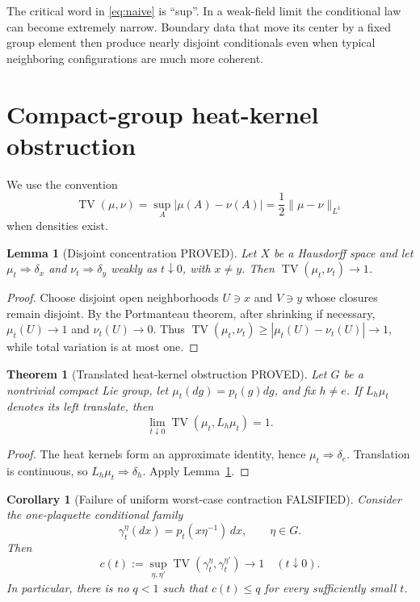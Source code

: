 \documentclass[11pt]{article}
\newcommand{\Pstatus}{\textcolor{proved}{\textsf{PROVED}}}
\newcommand{\Fstatus}{\textcolor{open}{\textsf{FALSIFIED}}}
\newcommand{\TV}{\operatorname{TV}}
\newtheorem{theorem}[definition]{Theorem}
\newtheorem{lemma}[definition]{Lemma}
\newtheorem{corollary}[definition]{Corollary}
\theoremstyle{remark}
\begin{document}
The critical word in \eqref{eq:naive} is ``sup''.  In a weak-field limit the
conditional law can become extremely narrow.  Boundary data that move its
center by a fixed group element then produce nearly disjoint conditionals even
when typical neighboring configurations are much more coherent.

\section{Compact-group heat-kernel obstruction}

We use the convention
\[
 \TV(\mu,\nu)=\sup_{A}|\mu(A)-\nu(A)|
              =\frac12\|\mu-\nu\|_{L^1}
\]
when densities exist.

\begin{lemma}[Disjoint concentration \Pstatus]\label{lem:disjoint}
Let $X$ be a Hausdorff space and let $\mu_t\Rightarrow\delta_x$ and
$\nu_t\Rightarrow\delta_y$ weakly as $t\downarrow0$, with $x\ne y$.
Then $\TV(\mu_t,\nu_t)\to1$.
\end{lemma}

\begin{proof}
Choose disjoint open neighborhoods $U\ni x$ and $V\ni y$ whose closures remain
disjoint.  By the Portmanteau theorem, after shrinking if necessary,
$\mu_t(U)\to1$ and $\nu_t(U)\to0$.  Thus
$\TV(\mu_t,\nu_t)\ge|\mu_t(U)-\nu_t(U)|\to1$, while total variation is at most
one.
\end{proof}

\begin{theorem}[Translated heat-kernel obstruction \Pstatus]\label{thm:tv}
Let $G$ be a nontrivial compact Lie group, let
$\mu_t(dg)=p_t(g)dg$, and fix $h\ne e$.  If $L_h\mu_t$ denotes its left
translate, then
\[
 \lim_{t\downarrow0}\TV(\mu_t,L_h\mu_t)=1.
\]
\end{theorem}

\begin{proof}
The heat kernels form an approximate identity, hence
$\mu_t\Rightarrow\delta_e$.  Translation is continuous, so
$L_h\mu_t\Rightarrow\delta_h$.  Apply Lemma~\ref{lem:disjoint}.
\end{proof}

\begin{corollary}[Failure of uniform worst-case contraction \Fstatus]
Consider the one-plaquette conditional family
\[
 \gamma_t^\eta(dx)=p_t(x\eta^{-1})\,dx,
 \qquad\eta\in G.
\]
Then
\[
 c(t):=\sup_{\eta,\eta'}\TV(\gamma_t^\eta,\gamma_t^{\eta'})
 \longrightarrow1
 \quad(t\downarrow0).
\]
In particular, there is no $q<1$ such that $c(t)\le q$ for every sufficiently
small $t$.
\end{corollary}
\end{document}
